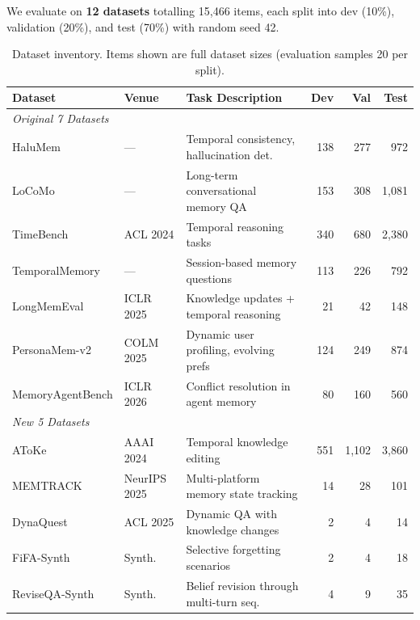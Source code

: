 \documentclass[11pt,a4paper]{article}
\begin{document}
We evaluate on \textbf{12 datasets} totalling 15{,}466 items, each split into
dev (10\%), validation (20\%), and test (70\%) with random seed 42.

\begin{table}[H]
\centering
\caption{Dataset inventory. Items shown are full dataset sizes
(evaluation samples 20 per split).}
\label{tab:datasets}
\small
\begin{tabularx}{\textwidth}{llXrrr}
\toprule
\textbf{Dataset} & \textbf{Venue} & \textbf{Task Description} & \textbf{Dev} & \textbf{Val} & \textbf{Test} \\
\midrule
\multicolumn{6}{l}{\textit{Original 7 Datasets}} \\
\midrule
HaluMem          & ---         & Temporal consistency, hallucination det. & 138 & 277 & 972 \\
LoCoMo           & ---         & Long-term conversational memory QA       & 153 & 308 & 1{,}081 \\
TimeBench        & ACL 2024    & Temporal reasoning tasks                 & 340 & 680 & 2{,}380 \\
TemporalMemory   & ---         & Session-based memory questions            & 113 & 226 & 792 \\
LongMemEval      & ICLR 2025   & Knowledge updates + temporal reasoning   & 21  & 42  & 148 \\
PersonaMem-v2    & COLM 2025   & Dynamic user profiling, evolving prefs   & 124 & 249 & 874 \\
MemoryAgentBench & ICLR 2026   & Conflict resolution in agent memory      & 80  & 160 & 560 \\
\midrule
\multicolumn{6}{l}{\textit{New 5 Datasets}} \\
\midrule
AToKe            & AAAI 2024   & Temporal knowledge editing               & 551  & 1{,}102 & 3{,}860 \\
MEMTRACK         & NeurIPS 2025 & Multi-platform memory state tracking    & 14   & 28   & 101 \\
DynaQuest        & ACL 2025    & Dynamic QA with knowledge changes        & 2    & 4    & 14 \\
FiFA-Synth       & Synth.      & Selective forgetting scenarios            & 2    & 4    & 18 \\
ReviseQA-Synth   & Synth.      & Belief revision through multi-turn seq.  & 4    & 9    & 35 \\
\bottomrule
\end{tabularx}
\end{table}
\end{document}
